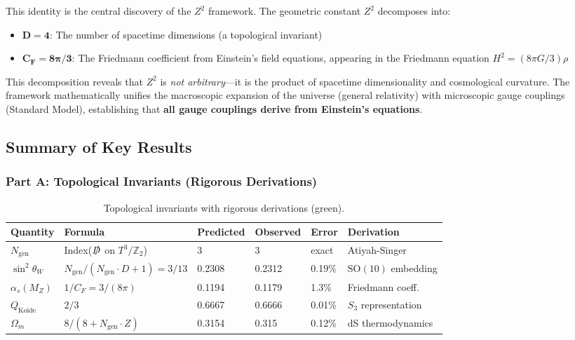 \documentclass[11pt,a4paper]{article}
\theoremstyle{plain}
\theoremstyle{definition}
\theoremstyle{remark}
\newcommand{\MZ}{M_Z}
\newcommand{\CF}{C_F}
\newcommand{\Ngen}{N_{\text{gen}}}
\newcommand{\alphas}{\alpha_s}
\newcommand{\thetaW}{\theta_W}
\newcommand{\Omegam}{\Omega_m}
\newcommand{\Tthree}{T^3}
\newcommand{\Ztwo}{\mathbb{Z}_2}
\newcommand{\SOten}{\text{SO}(10)}
\begin{document}
This identity is the central discovery of the $Z^2$ framework. The geometric constant $Z^2$ decomposes into:
\begin{itemize}
  \item $\mathbf{D = 4}$: The number of spacetime dimensions (a topological invariant)
  \item $\mathbf{\CF = 8\pi/3}$: The Friedmann coefficient from Einstein's field equations, appearing in the Friedmann equation $H^2 = (8\pi G/3)\rho$
\end{itemize}

This decomposition reveals that $Z^2$ is \emph{not arbitrary}---it is the product of spacetime dimensionality and cosmological curvature. The framework mathematically unifies the macroscopic expansion of the universe (general relativity) with microscopic gauge couplings (Standard Model), establishing that \textbf{all gauge couplings derive from Einstein's equations}.

\subsection{Summary of Key Results}

\subsubsection{Part A: Topological Invariants (Rigorous Derivations)}

\begin{table}[h!]
\centering
\begin{tabular}{llllll}
\toprule
\textbf{Quantity} & \textbf{Formula} & \textbf{Predicted} & \textbf{Observed} & \textbf{Error} & \textbf{Derivation} \\
\midrule
$\Ngen$ & Index($\slashed{D}$ on $\Tthree/\Ztwo$) & 3 & 3 & exact & Atiyah-Singer \\
$\sin^2\thetaW$ & $\Ngen/(\Ngen \cdot D + 1) = 3/13$ & 0.2308 & 0.2312 & 0.19\% & $\SOten$ embedding \\
$\alphas(\MZ)$ & $1/\CF = 3/(8\pi)$ & 0.1194 & 0.1179 & 1.3\% & Friedmann coeff. \\
$Q_{\text{Koide}}$ & $2/3$ & 0.6667 & 0.6666 & 0.01\% & $S_3$ representation \\
$\Omegam$ & $8/(8 + \Ngen \cdot Z)$ & 0.3154 & 0.315 & 0.12\% & dS thermodynamics \\
\bottomrule
\end{tabular}
\caption{Topological invariants with rigorous derivations (green).}
\end{table}
\end{document}
